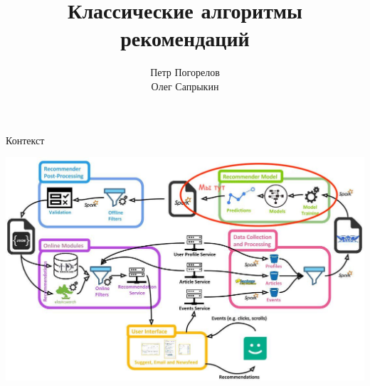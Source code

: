 \documentclass[11pt,aspectratio=169,handout]{beamer}
\author{Петр Погорелов\\Олег Сапрыкин}
\title{Классические алгоритмы рекомендаций}
\begin{document}
{

\begin{frame}
\titlepage
\end{frame}


}

\begin{frame}{Контекст}

\begin{center}
\includegraphics[scale=0.23]{images/mendeley.jpeg}
\end{center}

\end{frame}
\end{document}

